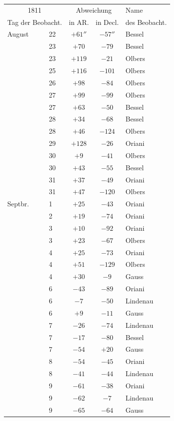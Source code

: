 \begin{center}

\fontsize{10}{12}\selectfont\setlength{\tabcolsep}{7pt}\renewcommand{\arraystretch}{1.05}\begin{tabular}{ll|c|c|l}
\multicolumn{2}{c|}{1811} & \multicolumn{2}{c|}{Abweichung} & Name \\
\multicolumn{2}{c|}{Tag der Beobacht.} & in AR. & in Decl. & des Beobacht. \\\hline
August & 22 & $+61''$ & $-57''$ & Bessel \\
 & 23 & $+70$ & $-79$ & Bessel \\
 & 23 & $+119$ & $-21$ & Olbers \\
 & 25 & $+116$ & $-101$ & Olbers \\
 & 26 & $+98$ & $-84$ & Olbers \\
 & 27 & $+99$ & $-99$ & Olbers \\
 & 27 & $+63$ & $-50$ & Bessel \\
 & 28 & $+34$ & $-68$ & Bessel \\
 & 28 & $+46$ & $-124$ & Olbers \\
 & 29 & $+128$ & $-26$ & Oriani \\
 & 30 & $+9$ & $-41$ & Olbers \\
 & 30 & $+43$ & $-55$ & Bessel \\
 & 31 & $+37$ & $-49$ & Oriani \\
 & 31 & $+47$ & $-120$ & Olbers \\
Septbr. & 1 & $+25$ & $-43$ & Oriani \\
 & 2 & $+19$ & $-74$ & Oriani \\
 & 3 & $+10$ & $-92$ & Oriani \\
 & 3 & $+23$ & $-67$ & Olbers \\
 & 4 & $+25$ & $-73$ & Oriani \\
 & 4 & $+51$ & $-129$ & Olbers \\
 & 4 & $+30$ & $-9$ & Gauss \\
 & 6 & $-43$ & $-89$ & Oriani \\
 & 6 & $-7$ & $-50$ & Lindenau \\
 & 6 & $+9$ & $-11$ & Gauss \\
 & 7 & $-26$ & $-74$ & Lindenau \\
 & 7 & $-17$ & $-80$ & Bessel \\
 & 7 & $-54$ & $+20$ & Gauss \\
 & 8 & $-54$ & $-45$ & Oriani \\
 & 8 & $-41$ & $-44$ & Lindenau \\
 & 9 & $-61$ & $-38$ & Oriani \\
 & 9 & $-62$ & $-7$ & Lindenau \\
 & 9 & $-65$ & $-64$ & Gauss \\
\end{tabular}
\end{center}

